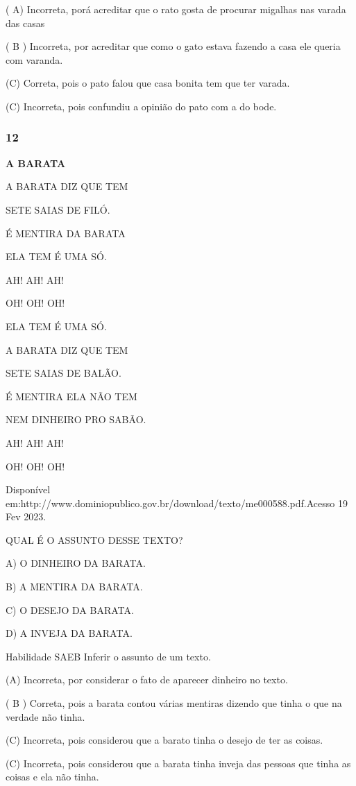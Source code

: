 \begin{escola}
( A) Incorreta, porá acreditar que o rato gosta de procurar migalhas nas
varada das casas

( B ) Incorreta, por acreditar que como o gato estava fazendo a casa ele
queria com varanda.

(C) Correta, pois o pato falou que casa bonita tem que ter varada.

(C) Incorreta, pois confundiu a opinião do pato com a do bode.

\subsubsection{12}\label{section-52}

\textbf{A BARATA}

A BARATA DIZ QUE TEM

SETE SAIAS DE FILÓ.

É MENTIRA DA BARATA

ELA TEM É UMA SÓ.

AH! AH! AH!

OH! OH! OH!

ELA TEM É UMA SÓ.

A BARATA DIZ QUE TEM

\protect\hypertarget{_heading=h.nmf14n}{}{}SETE SAIAS DE BALÃO.

É MENTIRA ELA NÃO TEM

NEM DINHEIRO PRO SABÃO.

AH! AH! AH!

OH! OH! OH!

Disponível
em:http://www.dominiopublico.gov.br/download/texto/me000588.pdf.Acesso
19 Fev 2023.

QUAL É O ASSUNTO DESSE TEXTO?

A) O DINHEIRO DA BARATA.

B) A MENTIRA DA BARATA.

C) O DESEJO DA BARATA.

D) A INVEJA DA BARATA.

Habilidade SAEB Inferir o assunto de um texto.

(A) Incorreta, por considerar o fato de aparecer dinheiro no texto.

( B ) Correta, pois a barata contou várias mentiras dizendo que tinha o
que na verdade não tinha.

(C) Incorreta, pois considerou que a barato tinha o desejo de ter as
coisas.

(C) Incorreta, pois considerou que a barata tinha inveja das pessoas que
tinha as coisas e ela não tinha.


\end{escola}
